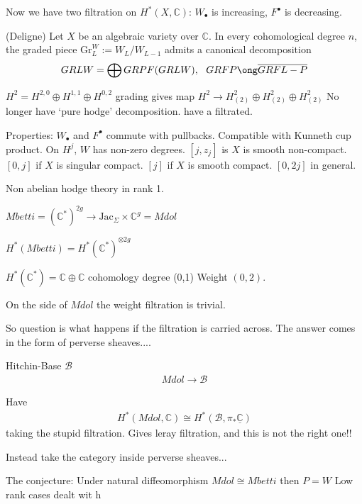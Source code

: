 Now we have two filtration on $H^* ( X, \mathbb{C} ) $: $ W_\bullet $ is increasing, $ F^\bullet $ is decreasing. 

\begin{theorem}
    (Deligne)  Let $ X $ be an algebraic variety over $ \mathbb{C} $. 
    In every cohomological degree $n$, 
    the graded piece $ \mathrm{Gr}_L ^W := W_L / W_{L-1 } $ 
    admits a canonical decomposition 
    \begin{align}
        GRLW = \bigoplus GRPF (GRLW) , ~~ GRFP \ong \overline{GRFL-P}
    \end{align}
\end{theorem}

$H^2 = H^{2,0} \oplus H^{1,1} \oplus H^{0,2} $ 
grading gives map $ H^2 \rightarrow   H^2 _{(2) } \oplus  H^2 _{(2) }\oplus   H^2 _{(2) } $ 
No longer have `pure hodge' decomposition. 
have a filtrated. 

Properties:
$ W_\bullet $ and $ F^\bullet $ commute with pullbacks. 
Compatible with Kunneth cup product. 
On $H^j $, $ W $ has non-zero degrees. 
$[j, z_j ] $ is $ X $ is smooth non-compact. 
$[ 0, j ] $ if $ X $ is singular compact.
$[ j ] $ if $ X $ is  smooth compact. 
$[ 0, 2j ] $ in general. 

Non abelian hodge theory in rank 1. 

$ Mbetti = ( \mathbb{C} ^* ) ^{2g} \rightarrow  \mathrm{Jac} _\Sigma \times \mathbb{C}  ^g = Mdol $ 

$H^* ( Mbetti) = H^* ( \mathbb{C} ^* ) ^{\otimes 2g} $ 

$ H^*( \mathbb{C} ^* ) = \mathbb{C} \oplus \mathbb{C}  $ 
cohomology degree (0,1) 
Weight $( 0, 2) $. 

On the side of $Mdol$ the weight filtration is trivial. 

So question is what happens if the filtration is carried across. 
The answer comes in the form of perverse sheaves.... 

Hitchin-Base  $\mathcal{B} $ 
\begin{align}
    Mdol \rightarrow  \mathcal{B} 
\end{align}

Have 
\begin{align}
     H^* ( Mdol , \mathbb{C} ) \cong H^* ( \mathcal{B} , \pi_* \underline{\mathbb{C} } ) 
\end{align}
taking the stupid filtration. 
Gives leray filtration, and this is not the right one!! 

Instead take the category inside perverse sheaves... 

The conjecture: 
Under natural diffeomorphism 
$Mdol \cong Mbetti $ then $ P= W $ 
Low rank cases dealt wit h 








 

